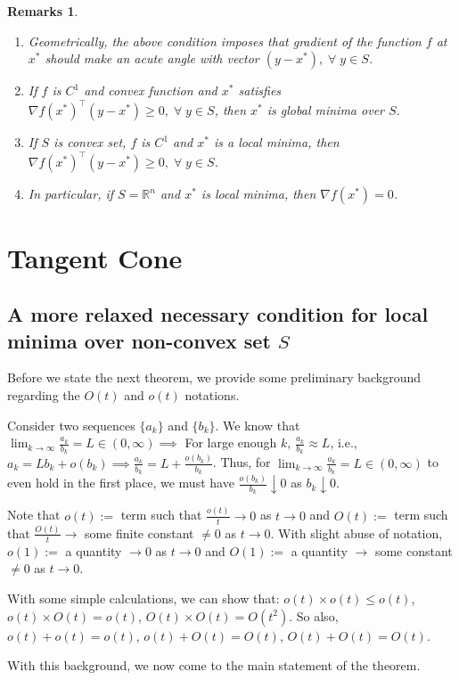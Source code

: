 \documentclass[twoside]{article}
\newtheorem*{remark}{Remarks}
\begin{document}
\begin{remark}
~\begin{enumerate}
  \item Geometrically, the above condition imposes that gradient of the function $f$ at $x^{*}$ should make an acute angle with vector $(y-x^{*}), \; \forall \; y \in S$.
  \item If $f$ is $C^{1}$ and convex function and $x^{*}$ satisfies $\nabla f(x^{*})^{\top}(y-x^{*}) \geqslant 0,  \; \forall \; y \in S$, then $x^{*}$ is global minima over $S$.
  \item If $S$ is convex set, $f$ is $C^{1}$ and $x^{*}$ is a local minima, then $\nabla f(x^{*})^{\top}(y-x^{*}) \geqslant 0,  \; \forall \;y \in S$.
  \item In particular, if $S=\mathbb{R}^{n}$ and $x^{*}$ is local minima, then $\nabla f(x^{*})=0$.
\end{enumerate}
\end{remark}

\section{Tangent Cone}


\subsection{A more relaxed necessary condition for local minima over non-convex set $S$}
Before we state the next theorem, we provide some preliminary background regarding the $O(t)$ and $o(t)$ notations.\par
Consider two sequences $\{a_{k}\}$ and $\{b_{k}\}$. We know that  $\lim_{k\to\infty} \frac{a_{k}}{b_{k}} = L \in (0,\infty) \implies$ For large enough $k$, $\frac{a_{k}}{b_{k}} \approx L $, i.e., $a_{k} = Lb_{k} + o(b_{k}) \implies \frac{a_{k}}{b_{k}} = L + \frac{o(b_{k})}{b_{k}} $. Thus, for $\lim_{k\to\infty} \frac{a_{k}}{b_{k}} = L \in (0,\infty)$ to even hold in the first place, we must have $\frac{o(b_{k})}{b_{k}} \downarrow 0$ as $b_{k} \downarrow 0 $.\par
Note that $o(t) := $ term such that $\frac{o(t)}{t} \rightarrow 0$ as $t \rightarrow 0$ and $O(t) := $ term such that $\frac{O(t)}{t} \rightarrow$ some finite constant $\neq 0$ as $t \rightarrow 0$. With slight abuse of notation, $o(1):=$ a quantity $\rightarrow 0$ as $t \rightarrow 0$ and $O(1):=$ a quantity $\rightarrow$ some constant $\neq 0$ as $t \rightarrow 0$.\par
With some simple calculations, we can show that: $o(t) \times o(t) \leqslant o(t)$, $o(t) \times O(t) = o(t)$, $O(t) \times O(t) = O(t^2)$. So also, $o(t) + o(t) = o(t)$, $o(t) + O(t) = O(t)$, $O(t) + O(t) = O(t)$.\par
With this background, we now come to the main statement of the theorem.
\end{document}
